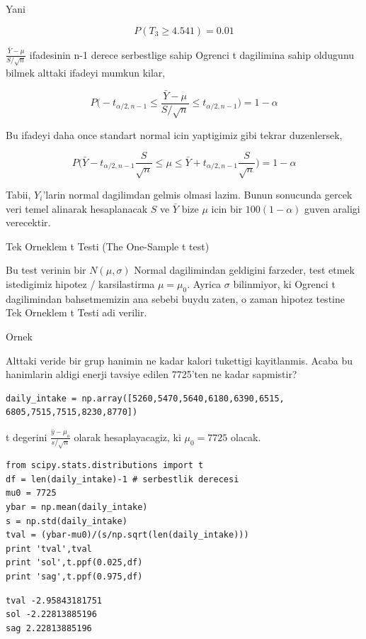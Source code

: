 \documentclass[12pt,fleqn]{article}\usepackage{../common}
\begin{document}
Yani

$$ P(T_3 \ge 4.541) = 0.01 $$

$\frac{\bar{Y}-\mu}{S/\sqrt{n}}$ ifadesinin n-1 derece serbestlige sahip Ogrenci t dagilimina sahip 
oldugunu bilmek alttaki ifadeyi mumkun kilar, 

$$ P \bigg(
-t_{\alpha/2,n-1} \le
\frac{\bar{Y}-\mu}{S/\sqrt{n}} \le 
t_{\alpha/2,n-1}
\bigg) = 1-\alpha
 $$

Bu ifadeyi daha once standart normal icin yaptigimiz gibi tekrar
duzenlersek,

$$ P \bigg(
\bar{Y}-t_{\alpha/2,n-1}\frac{S}{\sqrt{n}} \le
\mu \le 
\bar{Y}+t_{\alpha/2,n-1}\frac{S}{\sqrt{n}}
\bigg) = 1-\alpha
$$

Tabii, $Y_i$'larin normal dagilimdan gelmis olmasi lazim. Bunun sonucunda
gercek veri temel alinarak hesaplanacak $S$ ve $\bar{Y}$ bize $\mu$ icin
bir $100(1-\alpha)$ guven araligi verecektir. 


Tek Orneklem t Testi (The One-Sample t test)

Bu test verinin bir $N(\mu,\sigma)$ Normal dagilimindan geldigini farzeder,
test etmek istedigimiz hipotez / karsilastirma $\mu = \mu_0$. Ayrica
$\sigma$ bilinmiyor, ki Ogrenci t dagilimindan bahsetmemizin ana sebebi
buydu zaten, o zaman hipotez testine Tek Orneklem t Testi adi verilir.

Ornek

Alttaki veride bir grup hanimin ne kadar kalori tukettigi
kayitlanmis. Acaba bu hanimlarin aldigi enerji tavsiye edilen 7725'ten ne
kadar sapmistir?

\begin{verbatim}
daily_intake = np.array([5260,5470,5640,6180,6390,6515, 6805,7515,7515,8230,8770])
\end{verbatim}

t degerini $\frac{\bar{y}-\mu_o}{s/\sqrt{n}}$ olarak hesaplayacagiz, ki $\mu_0=7725$ olacak. 

\begin{verbatim}
from scipy.stats.distributions import t
df = len(daily_intake)-1 # serbestlik derecesi
mu0 = 7725
ybar = np.mean(daily_intake)
s = np.std(daily_intake)
tval = (ybar-mu0)/(s/np.sqrt(len(daily_intake)))
print 'tval',tval
print 'sol',t.ppf(0.025,df)
print 'sag',t.ppf(0.975,df)
\end{verbatim}

\begin{verbatim}
tval -2.95843181751
sol -2.22813885196
sag 2.22813885196
\end{verbatim}
\end{document}
